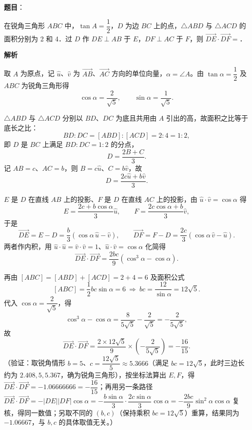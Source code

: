 \begin{answer}

\textbf{题目}：

在锐角三角形 \(ABC\) 中，\(\tan A=\dfrac{1}{2}\)，\(D\) 为边 \(BC\) 上的点，\(\triangle ABD\) 与 \(\triangle ACD\) 的面积分别为 2 和 4．过 \(D\) 作 \(DE\perp AB\) 于 \(E\)，\(DF\perp AC\) 于 \(F\)，则 \(\overrightarrow{DE}\cdot\overrightarrow{DF}=\)\gkblank{}．

\textbf{解析}

取 \(A\) 为原点，记 \(\hat{u}\)、\(\hat{v}\) 为 \(\overrightarrow{AB}\)、\(\overrightarrow{AC}\) 方向的单位向量，\(\alpha=\angle A\)。由 \(\tan\alpha=\dfrac{1}{2}\) 及 \(ABC\) 为锐角三角形得
\nopagebreak[4]
\[
\cos\alpha=\frac{2}{\sqrt{5}},\qquad \sin\alpha=\frac{1}{\sqrt{5}}.
\]

\(\triangle ABD\) 与 \(\triangle ACD\) 分别以 \(BD\)、\(DC\) 为底且共用由 \(A\) 引出的高，故面积之比等于底长之比：
\nopagebreak[4]
\[
BD:DC=[ABD]:[ACD]=2:4=1:2,
\]
即 \(D\) 是 \(BC\) 上满足 \(BD:DC=1:2\) 的分点，
\nopagebreak[4]
\[
D=\frac{2B+C}{3}.
\]
记 \(AB=c\)、\(AC=b\)，则 \(B=c\hat{u}\)、\(C=b\hat{v}\)，故
\nopagebreak[4]
\[
D=\frac{2c\hat{u}+b\hat{v}}{3}.
\]

\(E\) 是 \(D\) 在直线 \(AB\) 上的投影、\(F\) 是 \(D\) 在直线 \(AC\) 上的投影，由 \(\hat{u}\cdot\hat{v}=\cos\alpha\) 得
\nopagebreak[4]
\[
E=\frac{2c+b\cos\alpha}{3}\hat{u},\qquad F=\frac{2c\cos\alpha+b}{3}\hat{v},
\]
于是
\nopagebreak[4]
\[
\overrightarrow{DE}=E-D=\frac{b}{3}\left(\cos\alpha\,\hat{u}-\hat{v}\right),\qquad
\overrightarrow{DF}=F-D=\frac{2c}{3}\left(\cos\alpha\,\hat{v}-\hat{u}\right).
\]
两者作内积，用 \(\hat{u}\cdot\hat{u}=\hat{v}\cdot\hat{v}=1\)、\(\hat{u}\cdot\hat{v}=\cos\alpha\) 化简得
\nopagebreak[4]
\[
\overrightarrow{DE}\cdot\overrightarrow{DF}=\frac{2bc}{9}\left(\cos^{3}\alpha-\cos\alpha\right).
\]

再由 \([ABC]=[ABD]+[ACD]=2+4=6\) 及面积公式
\nopagebreak[4]
\[
[ABC]=\frac{1}{2}bc\sin\alpha=6\ \Longrightarrow\ bc=\frac{12}{\sin\alpha}=12\sqrt{5}.
\]
代入 \(\cos\alpha=\dfrac{2}{\sqrt{5}}\)，得
\nopagebreak[4]
\[
\cos^{3}\alpha-\cos\alpha=\frac{8}{5\sqrt{5}}-\frac{2}{\sqrt{5}}=-\frac{2}{5\sqrt{5}},
\]
故
\nopagebreak[4]
\[
\overrightarrow{DE}\cdot\overrightarrow{DF}=\frac{2\times12\sqrt{5}}{9}\times\left(-\frac{2}{5\sqrt{5}}\right)=-\frac{16}{15}.
\]
（验证：取锐角情形 \(b=5\)、\(c=\dfrac{12\sqrt{5}}{5}\approx5.3666\)（满足 \(bc=12\sqrt{5}\)，此时三边长约为 \(2.408,5,5.367\)，确为锐角三角形），按坐标法算出 \(E,F\)，得 \(\overrightarrow{DE}\cdot\overrightarrow{DF}=-1.06666666=-\dfrac{16}{15}\)；再用另一条路径 \(\overrightarrow{DE}\cdot\overrightarrow{DF}=-|DE||DF|\cos\alpha=-\dfrac{b\sin\alpha}{3}\cdot\dfrac{2c\sin\alpha}{3}\cos\alpha=-\dfrac{2bc}{9}\sin^{2}\alpha\cos\alpha\) 复核，得同一数值；另取不同的 \((b,c)\)（保持乘积 \(bc=12\sqrt{5}\)）重算，结果同为 \(-1.06667\)，与 \(b,c\) 的具体取值无关。）


\end{answer}
